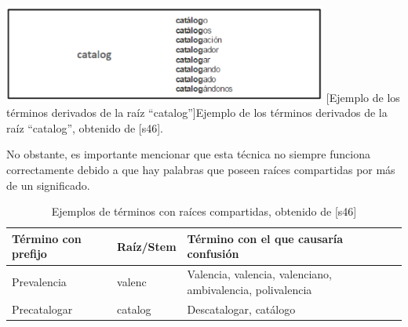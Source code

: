 \begin{enumerate}
\begin{center}
    \includegraphics[width=0.8\textwidth]{Images/Cap 2/Stemming.png}
    [Ejemplo de los términos derivados de la raíz “catalog”]{Ejemplo de los términos derivados de la raíz “catalog”, obtenido de [s46].}  %
\end{center}
No obstante, es importante mencionar que esta técnica no siempre funciona correctamente debido a que hay palabras que poseen raíces compartidas por más de un significado. 
\begin{table}[H]
    \centering
    \begin{tabular}{|p{4cm}|p{3cm}|p{5cm}|}
        \hline
        \textbf{Término con prefijo} & \textbf{Raíz/Stem} & \textbf{Término con el que causaría confusión} \\
        \hline
        Prevalencia & valenc & Valencia, valencia, valenciano, ambivalencia, polivalencia \\
        \hline
        Precatalogar & catalog & Descatalogar, catálogo \\
        \hline
    \end{tabular}
    \caption[Ejemplos de términos con raíces compartidas]{Ejemplos de términos con raíces compartidas, obtenido de [s46]}
    \label{tabla:confusion}
\end{table}

\end{enumerate}


